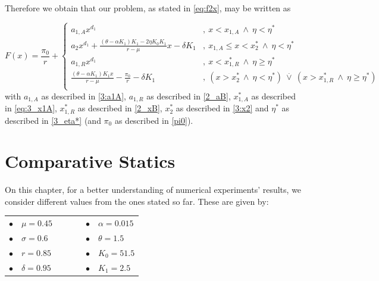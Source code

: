Therefore we obtain that our problem, as stated in \eqref{eq:f2x}, may be written as

\begin{equation}
F(x)=\frac{\pi_0}{r} + \begin{cases}
a_{1,A}x^{d_1}  &, \ x<x_{1,A} \  \wedge \ \eta<\eta^*\\
a_2x^{d_1}+\frac{(\theta-\alpha K_1)K_1-2 \eta K_0 K_1}{r-\mu} x - \delta K_1 &, \ x_{1,A} \leq x < x_2^* \ \wedge \ \eta<\eta^*\\
a_{1,R}x^{d_1} &, \ x<x_{1,R}^*  \ \wedge \ \eta\geq \eta^* \\
\frac{(\theta-\alpha K_1)K_1 x}{r-\mu} -\frac{\pi_0}{r} - \delta K_1   &, \ ( x>x_2^* \ \wedge \ \eta<\eta^*) \ \overset{.}{\vee} \ (x>x_{1,R}^* \ \wedge \ \eta \geq \eta^*) \\
\end{cases}
	\label{3_madzbigboy}
\end{equation}
with $a_{1,A}$ as described in \eqref{3:a1A}, $a_{1,R}$ as described in \eqref{2_aB}, $x^*_{1,A}$ as described in \eqref{eq:3_x1A}, $x^*_{1,R}$ as described in \eqref{2_xB}, $x^*_2$ as described in \eqref{3:x2} and $\eta^*$ as described in \eqref{3_eta*} (and $\pi_0$ as described in \eqref{pi0}).


\section{Comparative Statics}


On this chapter, for a better understanding of numerical experiments' results, we consider different values from the ones stated so far. These are given by:
\begin{table}[!htb]
	\centering
	\begin{tabular}{lllllll}
		$\bullet$ & $\mu=0.45$     &  & \hspace{7cm} &  &  $\bullet$ & $\alpha=0.015$ \\
		$\bullet$ & $\sigma=0.6$ &  & \hspace{7cm} &  &  $\bullet$ & $\theta=1.5$   \\
		$\bullet$ & $r=0.85$       &  & \hspace{7cm} &  &  $\bullet$ & $K_0=51.5$       \\
		$\bullet$ & $\delta=0.95$     &  & \hspace{7cm} & &  $\bullet$ & $K_1=2.5$                              
	\end{tabular}
\end{table}

